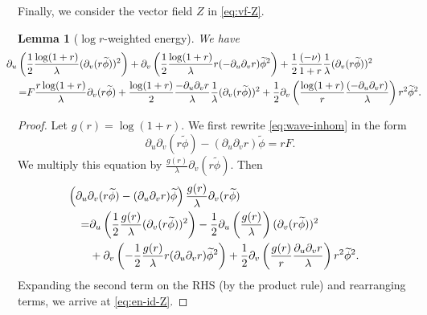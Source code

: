 \documentclass[10pt, reqno]{amsart}
\newtheorem{lemma}[theorem]{Lemma}
\theoremstyle{definition}
\theoremstyle{remark}
\theoremstyle{conjecture}
\numberwithin{equation}{section}
\newcommand{\rd}{\partial}
\newcommand{\0}{\emptyset}
\newcommand{\lmb}{\lambda}
\newcommand{\dur}{\nu}
\newcommand{\dvr}{\lmb}
\newcommand{\phibg}{\overline{\phi}}				%
\newcommand{\phidf}{\widetilde{\phi}}				%
\begin{document}
Finally, we consider the vector field $Z$ in \eqref{eq:vf-Z}. 
\begin{lemma}[$\log r$-weighted energy] \label{lem:DR}
We have
\begin{equation} \label{eq:en-id-Z}
\begin{aligned}
& \hskip-2em
	\rd_{u} \left( \frac{1}{2} \frac{\log(1+r)}{\dvr} (\rd_{v} (r \phidf))^{2} \right)
	+ \rd_{v} \left( \frac{1}{2} \frac{\log(1+r)}{\dvr} r (- \rd_{u} \rd_{v} r) \phidf^{2} \right)
	+ \frac{1}{2} \frac{(-\dur)}{1+r} \frac{1}{\dvr} (\rd_{v} (r \phidf))^{2} \\
	= & F \frac{r \log(1+r)}{\dvr} \rd_{v}(r \phidf) 
	+ \frac{\log(1+r)}{2} \frac{-\rd_{u} \rd_{v} r}{\dvr} \frac{1}{\dvr} (\rd_{v} (r \phidf))^{2}
	+ \frac{1}{2} \rd_{v} \left(\frac{\log(1+r)}{r} \frac{(- \rd_{u} \rd_{v} r)}{\dvr} \right) r^{2} \phidf^{2}.
\end{aligned}
\end{equation}

\end{lemma}
\begin{proof}
Let $g(r) = \log (1+r)$.
We first rewrite \eqref{eq:wave-inhom} in the form
\begin{equation*}
	\rd_{u} \rd_{v} (r \phidf) - (\rd_{u} \rd_{v} r) \phidf = r F.
\end{equation*}
We multiply this equation by $\frac{g(r)}{\dvr} \rd_{v}(r \phidf)$. Then
\begin{align*}
& \hskip-2em
	\left(\rd_{u} \rd_{v} (r \phidf) - (\rd_{u} \rd_{v} r) \phidf \right) \frac{g(r)}{\dvr} \rd_{v}(r \phidf) \\
= & \rd_{u} \left( \frac{1}{2} \frac{g(r)}{\dvr} (\rd_{v} (r \phidf))^{2} \right) - \frac{1}{2} \rd_{u} \left( \frac{g(r)}{\dvr} \right) (\rd_{v} (r \phidf))^{2} \\
& + \rd_{v} \left(- \frac{1}{2} \frac{g(r)}{\dvr} r (\rd_{u} \rd_{v} r) \phidf^{2} \right) + \frac{1}{2} \rd_{v} \left(\frac{g(r)}{r} \frac{\rd_{u} \rd_{v} r}{\dvr} \right) r^{2} \phidf^{2}.
\end{align*}
Expanding the second term on the RHS (by the product rule) and rearranging terms, we arrive at \eqref{eq:en-id-Z}. \qedhere
\end{proof}
\end{document}
